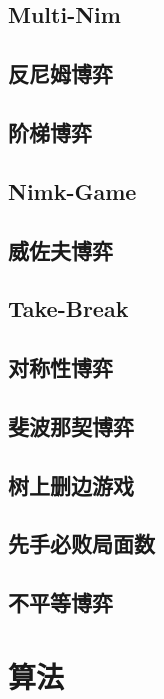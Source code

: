 \documentclass{article}
\begin{document}
\subsection{Multi-Nim} 

\subsection{反尼姆博弈} 

\subsection{阶梯博弈} 

\subsection{Nimk-Game} 

\subsection{威佐夫博弈} 

\subsection{Take-Break} 

\subsection{对称性博弈} 

\subsection{斐波那契博弈} 

\subsection{树上删边游戏} 

\subsection{先手必败局面数} 

\subsection{不平等博弈} 



\newpage %
\section{算法} %
\end{document}
